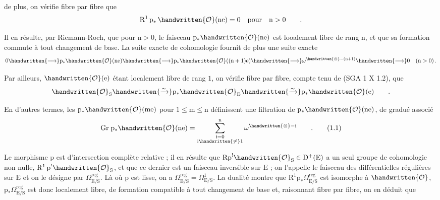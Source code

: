 \begingroup
\normalmarginpar
de plus, on vérifie fibre par fibre que
\[
\mathrm{R}^{1}\,\mathrm{p}_{*}\,\handwritten{\mathcal{O}}(\mathrm{ne})=0\quad\text{pour}\quad\mathrm{n}>0\qquad.
\]

Il en résulte, par Riemann-Roch, que pour $\mathrm{n}>0$, le faisceau $\mathrm{p}_{*}\handwritten{\mathcal{O}}(\mathrm{ne})$ est looalement libre de rang $\mathrm{n}$, et que sa formation commute à tout changement de base. La suite exacte de cohomologie fournit de plus une suite exacte
\[
0\handwritten{\longrightarrow}\mathrm{p}_{*}\handwritten{\mathcal{O}}(\mathrm{ne})
\handwritten{\longrightarrow}\mathrm{p}_{*}\handwritten{\mathcal{O}}((\mathrm{n}+1)\mathrm{e})
\handwritten{\longrightarrow}\omega^{\handwritten{\otimes}-(\mathrm{n}+1)}
\handwritten{\longrightarrow}0\quad(\mathrm{n}>0)\,.
\]

Par ailleurs, $\handwritten{\mathcal{O}}(\mathrm{e})$ étant localement libre de rang $1$, on vérifie fibre par fibre, compte tenu de (SGA 1 X 1.2), que
\[
\handwritten{\mathcal{O}}_{\mathrm{S}}\handwritten{\xrightarrow{\sim}}
\mathrm{p}_{*}\handwritten{\mathcal{O}}_{\mathrm{E}}\handwritten{\xrightarrow{\sim}}
\mathrm{p}_{*}\handwritten{\mathcal{O}}(\mathrm{e})\qquad.
\]

En d'autres termes, les $\mathrm{p}_{*}\handwritten{\mathcal{O}}(\mathrm{me})$ pour $1\leq\mathrm{m}\leq\mathrm{n}$ définissent une filtration de $\mathrm{p}_{*}\handwritten{\mathcal{O}}(\mathrm{ne})$, de gradué associé
\makeatletter\tagsleft@true\makeatother
\[
\mathrm{Gr}\;\mathrm{p}_{*}\handwritten{\mathcal{O}}(\mathrm{ne})
=\sum_{\substack{\mathrm{i}=0\\\mathrm{i}\handwritten{\neq}1}}^{\mathrm{n}}\omega^{\handwritten{\otimes}-\mathrm{i}}\qquad.
\tag*{(1.1)}
\]

Le morphisme $\mathrm{p}$ est d'intersection complète relative ; il en résulte que $\mathrm{Rp}^{!}\handwritten{\mathcal{O}}_{\mathrm{S}}\in\mathrm{D}^{+}(\mathrm{E})$ a un seul groupe de cohomologie non nulle, $\mathrm{R}^{1}\,\mathrm{p}^{!}\handwritten{\mathcal{O}}_{\mathrm{S}}$, et que ce dernier est un faisceau inversible sur $\mathrm{E}$ ; on l'appelle le faisceau des différentielles régulières sur $\mathrm{E}$ et on le désigne par $\Omega^{\mathrm{reg}}_{\mathrm{E}/\mathrm{S}}$. Là où $\mathrm{p}$ est lisse, on a $\Omega^{\mathrm{reg}}_{\mathrm{E}/\mathrm{S}}=\Omega^{1}_{\mathrm{E}/\mathrm{S}}$. La dualité montre que $\mathrm{R}^{1}\mathrm{p}_{*}\Omega^{\mathrm{rcg}}_{\mathrm{E}/\mathrm{S}}$ cst isomorphe à $\handwritten{\mathcal{O}}$, $\mathrm{p}_{*}\Omega^{\mathrm{rcg}}_{\mathrm{E}/\mathrm{S}}$ est donc \handwritten{/} localement libre, de formation compatible à tout changement de base et, raisonnant fibre par fibre, on en déduit que
\endgroup
\clearpage

